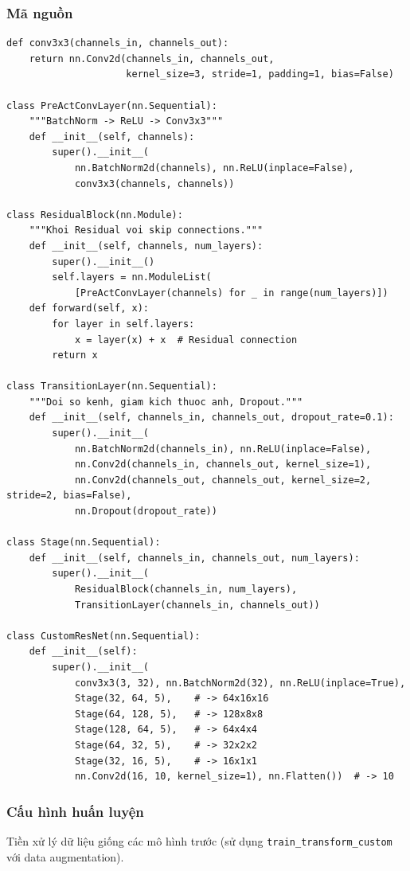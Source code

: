 \documentclass[a4paper]{article}
\newcommand{\code}[1]{\texttt{\textcolor{blue!80!black}{#1}}}
\theoremstyle{definition}
\begin{document}
\subsubsection{Mã nguồn}
\begin{verbatim}
def conv3x3(channels_in, channels_out):
    return nn.Conv2d(channels_in, channels_out,
                     kernel_size=3, stride=1, padding=1, bias=False)

class PreActConvLayer(nn.Sequential):
    """BatchNorm -> ReLU -> Conv3x3"""
    def __init__(self, channels):
        super().__init__(
            nn.BatchNorm2d(channels), nn.ReLU(inplace=False),
            conv3x3(channels, channels))

class ResidualBlock(nn.Module):
    """Khoi Residual voi skip connections."""
    def __init__(self, channels, num_layers):
        super().__init__()
        self.layers = nn.ModuleList(
            [PreActConvLayer(channels) for _ in range(num_layers)])
    def forward(self, x):
        for layer in self.layers:
            x = layer(x) + x  # Residual connection
        return x

class TransitionLayer(nn.Sequential):
    """Doi so kenh, giam kich thuoc anh, Dropout."""
    def __init__(self, channels_in, channels_out, dropout_rate=0.1):
        super().__init__(
            nn.BatchNorm2d(channels_in), nn.ReLU(inplace=False),
            nn.Conv2d(channels_in, channels_out, kernel_size=1),
            nn.Conv2d(channels_out, channels_out, kernel_size=2, stride=2, bias=False),
            nn.Dropout(dropout_rate))

class Stage(nn.Sequential):
    def __init__(self, channels_in, channels_out, num_layers):
        super().__init__(
            ResidualBlock(channels_in, num_layers),
            TransitionLayer(channels_in, channels_out))

class CustomResNet(nn.Sequential):
    def __init__(self):
        super().__init__(
            conv3x3(3, 32), nn.BatchNorm2d(32), nn.ReLU(inplace=True),
            Stage(32, 64, 5),    # -> 64x16x16
            Stage(64, 128, 5),   # -> 128x8x8
            Stage(128, 64, 5),   # -> 64x4x4
            Stage(64, 32, 5),    # -> 32x2x2
            Stage(32, 16, 5),    # -> 16x1x1
            nn.Conv2d(16, 10, kernel_size=1), nn.Flatten())  # -> 10
\end{verbatim}

\subsubsection{Cấu hình huấn luyện}
Tiền xử lý dữ liệu giống các mô hình trước (sử dụng \code{train\_transform\_custom} với data augmentation).
\end{document}
